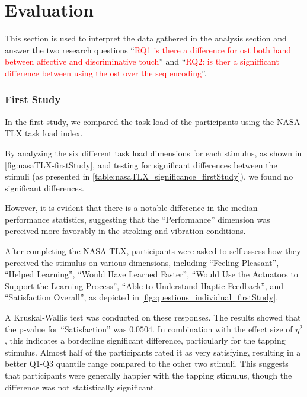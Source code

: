 \chapter{Evaluation}
\label{ch:Evaluation}

This section is used to interpret the data gathered in the analysis section and answer the two research questions \enquote{\textcolor{red}{RQ1 is there a difference for ost both hand between affective and discriminative touch}} and
\enquote{\textcolor{red}{RQ2: is ther a signifficant difference between using the ost over the seq encoding}}.

\subsection{First Study}
In the first study, we compared the task load of the participants using the NASA TLX task load index. 

By analyzing the six different task load dimensions for each stimulus, as shown in \autoref{fig:nasaTLX-firstStudy}, and testing for significant differences between the stimuli (as presented in \autoref{table:nasaTLX_significance_firstStudy}), we found no significant differences. 

However, it is evident that there is a notable difference in the median performance statistics, suggesting that the \enquote{Performance} dimension was perceived more favorably in the stroking and vibration conditions.


After completing the NASA TLX, participants were asked to self-assess how they perceived the stimulus on various dimensions, including \enquote{Feeling Pleasant}, \enquote{Helped Learning}, \enquote{Would Have Learned Faster}, \enquote{Would Use the Actuators to Support the Learning Process}, \enquote{Able to Understand Haptic Feedback}, and \enquote{Satisfaction Overall}, as depicted in \autoref{fig:questions_individual_firstStudy}.

A Kruskal-Wallis test was conducted on these responses. The results showed that the p-value for \enquote{Satisfaction} was $0.0504$. In combination with the effect size of $\eta^2$, this indicates a borderline significant difference, particularly for the tapping stimulus. Almost half of the participants rated it as very satisfying, resulting in a better Q1-Q3 quantile range compared to the other two stimuli. This suggests that participants were generally happier with the tapping stimulus, though the difference was not statistically significant.

